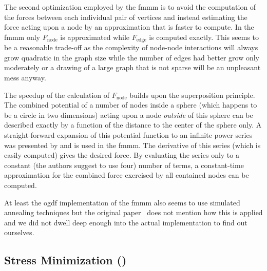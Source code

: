 \documentclass{graphstudy}
\begin{document}
The second optimization employed by the \ac{fmmm} is to avoid the computation of the forces between each individual pair
of vertices and instead estimating the force acting upon a node by an approximation that is faster to compute.  In the
\ac{fmmm} only \(F_\mathrm{node}\) is approximated while \(F_\mathrm{edge}\) is computed exactly.  This seems to be a
reasonable trade-off as the complexity of node-node interactions will always grow quadratic in the graph size while the
number of edges had better grow only moderately or a drawing of a large graph that is not sparse will be an unpleasant
mess anyway.

The speedup of the calculation of \(F_\mathrm{node}\) builds upon the superposition principle.  The combined potential
of a number of nodes inside a sphere (which happens to be a circle in two dimensions) acting upon a node \emph{outside}
of this sphere can be described exactly by a function of the distance to the center of the sphere only.  A
straight-forward expansion of this potential function to an infinite power series was presented by
\textcite{Greengard1987} and is used in the \ac{fmmm}.  The derivative of this series (which is easily computed) gives
the desired force.  By evaluating the series only to a constant (the authors suggest to use four) number of terms, a
constant-time approximation for the combined force exercised by all contained nodes can be computed.

At least the \ac{ogdf} implementation of the \ac{fmmm} also seems to use simulated annealing techniques but the original
paper~\cite{Hachul2005} does not mention how this is applied and we did not dwell deep enough into the actual
implementation to find out ourselves.

\subsection{Stress Minimization ()}
\label{sec:stress}
\end{document}

